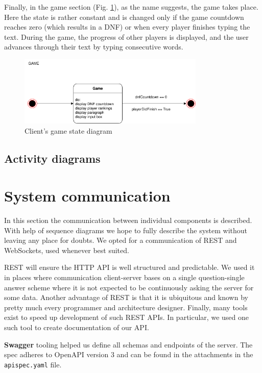 \documentclass[titlepage]{article}
\newcommand{\figref}[1]{{(Fig. \hypersetup{linkcolor=blue}\ref{#1})}}
\begin{document}
Finally, in the game section \figref{fig:state-client-game}, as the name suggests, the game takes place. Here the state is rather constant and is changed only if the game countdown reaches zero (which results in a DNF) or when every player finishes typing the text. During the game, the progress of other players is displayed, and the user advances through their text by typing consecutive words.

\begin{figure}[H]
	\centering
	\includegraphics[width=0.79\textwidth]{state_diagram_game.png}
	\caption{Client's game state diagram}
	\label{fig:state-client-game}
\end{figure}

\subsection{Activity diagrams}

\section{System communication}

In this section the communication between individual components is described. With help of sequence diagrams we hope to fully describe the system without leaving any place for doubts. We opted for a communication of REST and WebSockets, used whenever best suited.

REST will ensure the HTTP API is well structured and predictable. We used it in places where communication client-server bases on a single question-single answer scheme where it is not expected to be continuously asking the server for some data. Another advantage of REST is that it is ubiquitous and known by pretty much every programmer and architecture designer. Finally, many tools exist to speed up development of such REST APIs. In particular, we used one such tool to create documentation of our API.

\textbf{Swagger} tooling helped us define all schemas and endpoints of the server. The spec adheres to OpenAPI version 3 and can be found in the attachments in the \texttt{apispec.yaml} file.
\end{document}
